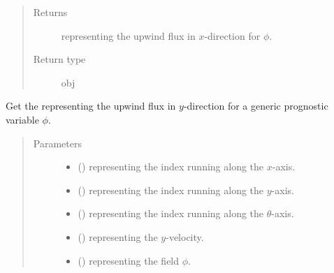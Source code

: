 \documentclass[letterpaper,10pt,english]{sphinxmanual}
\begin{document}
\begin{fulllineitems}
\begin{fulllineitems}
\begin{quote}
\begin{description}
\begin{itemize}
\end{itemize}

\item[{Returns}] \leavevmode
{} representing the upwind flux in \(x\)-direction for \(\phi\).

\item[{Return type}] \leavevmode
obj

\end{description}\end{quote}

\end{fulllineitems}


\begin{fulllineitems}
\label{\detokenize{api:dycore.flux_isentropic_upwind.FluxIsentropicUpwind._get_upwind_flux_y}}
Get the  representing the upwind flux in \(y\)-direction for a generic
prognostic variable \(\phi\).
\begin{quote}\begin{description}
\item[{Parameters}] \leavevmode\begin{itemize}
\item {} 
 () \textendash{}  representing the index running along the \(x\)-axis.

\item {} 
 () \textendash{}  representing the index running along the \(y\)-axis.

\item {} 
 () \textendash{}  representing the index running along the \(\theta\)-axis.

\item {} 
 () \textendash{}  representing the \(y\)-velocity.

\item {} 
 () \textendash{}  representing the field \(\phi\).


\end{itemize}
\end{description}
\end{quote}
\end{fulllineitems}
\end{fulllineitems}
\end{document}
